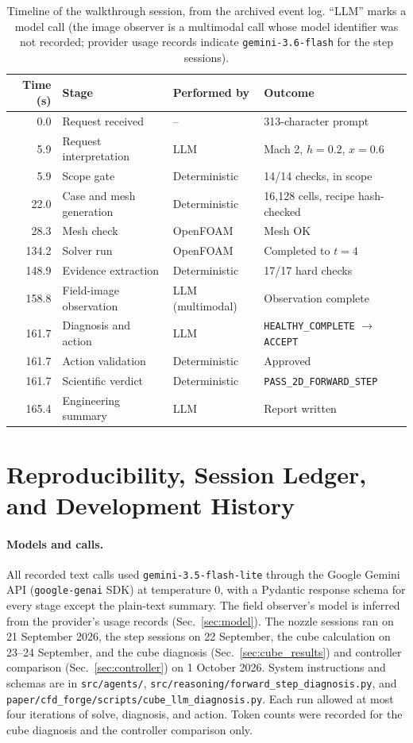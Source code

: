 \documentclass[11pt]{article}
\begin{document}
\begin{table}[!h]
\centering
\caption{Timeline of the walkthrough session, from the archived event log.
``LLM'' marks a model call (the image observer is a multimodal call whose
model identifier was not recorded; provider usage records indicate
\texttt{gemini-3.6-flash} for the step sessions).}
\label{tab:timeline}
\small
\begin{tabular}{@{}rlll@{}}
\toprule
Time (s) & Stage & Performed by & Outcome \\
\midrule
0.0 & Request received & -- & 313-character prompt \\
5.9 & Request interpretation & LLM & Mach 2, $h=0.2$, $x=0.6$ \\
5.9 & Scope gate & Deterministic & 14/14 checks, in scope \\
22.0 & Case and mesh generation & Deterministic & 16,128 cells, recipe hash-checked \\
28.3 & Mesh check & OpenFOAM & Mesh OK \\
134.2 & Solver run & OpenFOAM & Completed to $t=4$ \\
148.9 & Evidence extraction & Deterministic & 17/17 hard checks \\
158.8 & Field-image observation & LLM (multimodal) & Observation complete \\
161.7 & Diagnosis and action & LLM & \texttt{HEALTHY\_COMPLETE} $\rightarrow$ \texttt{ACCEPT} \\
161.7 & Action validation & Deterministic & Approved \\
161.7 & Scientific verdict & Deterministic & \texttt{PASS\_2D\_FORWARD\_STEP} \\
165.4 & Engineering summary & LLM & Report written \\
\bottomrule
\end{tabular}
\end{table}

\section{Reproducibility, Session Ledger, and Development History}
\label{app:repro}

\paragraph{Models and calls.} All recorded text calls used
\texttt{gemini-3.5-flash-lite} through the Google Gemini API
(\texttt{google-genai} SDK) at temperature 0, with a Pydantic response schema
for every stage except the plain-text summary. The field observer's model is
inferred from the provider's usage records (Sec.~\ref{sec:model}).
The nozzle sessions ran on 21 September 2026, the step sessions on 22
September, the cube calculation on 23--24 September, and the cube diagnosis
(Sec.~\ref{sec:cube_results}) and controller comparison
(Sec.~\ref{sec:controller}) on 1 October 2026. System instructions and schemas
are in \texttt{src/agents/},
\nolinkurl{src/reasoning/forward_step_diagnosis.py}, and
\nolinkurl{paper/cfd_forge/scripts/cube_llm_diagnosis.py}. Each run allowed at
most four iterations of solve, diagnosis, and action. Token counts were
recorded for the cube diagnosis and the controller comparison only.
\end{document}
